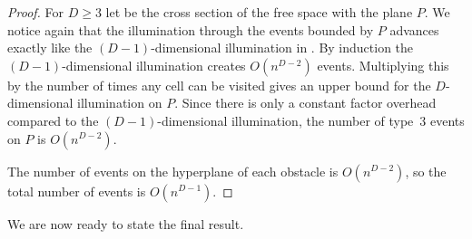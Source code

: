 \documentclass[english,gradu]{tktltiki2018}
\begin{document}
\begin{proof}
For $D\ge 3$ let \fspaceb be the cross section of the free space \fspace with the plane $P$.
We notice again that the illumination through the events bounded by $P$ advances exactly like the $(D-1)$-dimensional illumination in \fspaceb.
By induction the $(D-1)$-dimensional illumination creates $O(n^{D-2})$ events.
Multiplying this by the number of times any cell can be visited gives an upper bound for the $D$-dimensional illumination on $P$.
Since there is only a constant factor overhead compared to the $(D-1)$-dimensional illumination, the number of type~3 events on $P$ is $O(n^{D-2})$.

The number of events on the hyperplane of each obstacle is $O(n^{D-2})$, so the total number of events is $O(n^{D-1})$.
\end{proof}

We are now ready to state the final result.
\end{document}
